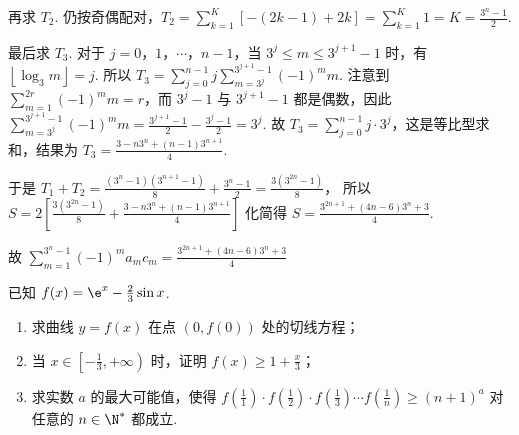 \begin{solution}
\begin{enumerate}
\begin{enumerate}
再求 \(T_2\). 仍按奇偶配对，\(T_2=\sum_{k=1}^{K}\left[ -\left( 2k-1 \right)+2k \right]=\sum_{k=1}^{K}1=K=\frac{3^n-1}{2}\).

最后求 \(T_3\). 对于 \(j=0\)，\(1\)，\(\cdots\)，\(n-1\)，当 \(3^j\le m\le 3^{j+1}-1\) 时，有 \(\left\lfloor \log_3 m \right\rfloor =j\). 所以 \(T_3=\sum_{j=0}^{n-1}j\sum_{m=3^j}^{3^{j+1}-1}\left( -1 \right)^m m\). 注意到 \(\sum_{m=1}^{2r}\left( -1 \right)^m m=r\)，而 \(3^j-1\) 与 \(3^{j+1}-1\) 都是偶数，因此 \(\sum_{m=3^j}^{3^{j+1}-1}\left( -1 \right)^m m=\frac{3^{j+1}-1}{2}-\frac{3^j-1}{2}=3^j\). 故 \(T_3=\sum_{j=0}^{n-1}j\cdot 3^j\)，这是等比型求和，结果为 \(T_3=\frac{3-n3^n+\left( n-1 \right)3^{n+1}}{4}\).

于是
\(
T_1+T_2=\frac{\left( 3^n-1 \right)\left( 3^{n+1}-1 \right)}{8}+\frac{3^n-1}{2}
=\frac{3\left( 3^{2n}-1 \right)}{8}
\)，
所以
\(
S=2\left[ \frac{3\left( 3^{2n}-1 \right)}{8}+\frac{3-n3^n+\left( n-1 \right)3^{n+1}}{4} \right]
\)
化简得 \(S=\frac{3^{2n+1}+\left( 4n-6 \right)3^n+3}{4}\).

故
\(
\sum_{m=1}^{3^n-1}\left( -1 \right)^m a_m c_m=\frac{3^{2n+1}+\left( 4n-6 \right)3^n+3}{4}
\)
\end{enumerate}
\end{enumerate}
\end{solution}

\begin{problem}
已知 \(f(x)=\e^x-\frac{2}{3}\sin x\).

\begin{enumerate}
\item 求曲线 \(y=f(x)\) 在点 \((0,f(0))\) 处的切线方程；
\item 当 \(x\in \left[ -\frac{1}{3},+\infty \right)\) 时，证明 \(f(x)\ge 1+\frac{x}{3}\)；
\item 求实数 \(a\) 的最大可能值，使得 \(f\left( \frac{1}{1} \right)\cdot f\left( \frac{1}{2} \right)\cdot f\left( \frac{1}{3} \right)\cdots f\left( \frac{1}{n} \right)\ge (n+1)^a\) 对任意的 \(n\in \N^*\) 都成立.
\end{enumerate}
\end{problem}

